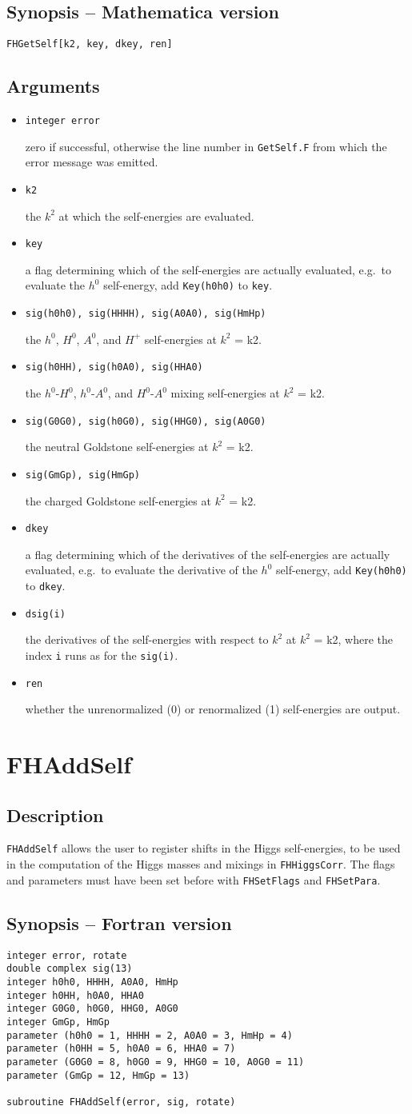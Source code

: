 \documentclass[12pt,a4paper]{report}
\newcommand{\CODE}[1]{\texttt{#1}}
\newcommand{\VARIN}[1]{%
  \item[\fbox{\scriptsize\textsc{in}}]
  \CODE{#1}\par}
\newcommand{\VAROUT}[1]{%
  \item[\fbox{\scriptsize\textsc{out}}]
  \CODE{#1}\par}
\newcommand{\ROUTINE}[1]{\pagebreak
  \section*{#1}%
  \addcontentsline{toc}{section}{#1}}
\newcommand{\DESCRIPTION}{\subsection*{Description}}
\newcommand{\FSYNOPSIS}{\subsection*{Synopsis -- Fortran version}}
\newcommand{\MSYNOPSIS}{\subsection*{Synopsis -- Mathematica version}}
\newcommand{\ARGUMENTS}{\subsection*{Arguments}\begin{itemize}}
\newcommand{\ENDARGUMENTS}{\end{itemize}}
\newcommand\eg{e.g.\ }
\begin{document}
\MSYNOPSIS

\begin{verbatim}
FHGetSelf[k2, key, dkey, ren]
\end{verbatim}

\ARGUMENTS

\VAROUT{integer error}
zero if successful, otherwise the line number in \CODE{GetSelf.F}
from which the error message was emitted.

\VARIN{k2}
the $k^2$ at which the self-energies are evaluated.

\VARIN{key}
a flag determining which of the self-energies are actually evaluated,
\eg to evaluate the $h^0$ self-energy, add \CODE{Key(h0h0)} to
\CODE{key}.

\VAROUT{sig(h0h0), sig(HHHH), sig(A0A0), sig(HmHp)}
the $h^0$, $H^0$, $A^0$, and $H^+$ self-energies at $k^2$ = k2.

\VAROUT{sig(h0HH), sig(h0A0), sig(HHA0)}
the $h^0$-$H^0$, $h^0$-$A^0$, and $H^0$-$A^0$ mixing self-energies at 
$k^2$ = k2.

\VAROUT{sig(G0G0), sig(h0G0), sig(HHG0), sig(A0G0)}
the neutral Goldstone self-energies at $k^2$ = k2.

\VAROUT{sig(GmGp), sig(HmGp)}
the charged Goldstone self-energies at $k^2$ = k2.

\VARIN{dkey}
a flag determining which of the derivatives of the self-energies
are actually evaluated, \eg to evaluate the derivative of the 
$h^0$ self-energy, add \CODE{Key(h0h0)} to \CODE{dkey}.

\VAROUT{dsig(i)}
the derivatives of the self-energies with respect to $k^2$ at
$k^2$ = k2, where the index \CODE{i} runs as for the \CODE{sig(i)}.

\VARIN{ren}
whether the unrenormalized (0) or renormalized (1) self-energies
are output.

\ENDARGUMENTS


\ROUTINE{FHAddSelf}

\DESCRIPTION

\CODE{FHAddSelf} allows the user to register shifts in the Higgs
self-energies, to be used in the computation of the Higgs masses and
mixings in \CODE{FHHiggsCorr}.  The flags and parameters must have been
set before with \CODE{FHSetFlags} and \CODE{FHSetPara}.

\FSYNOPSIS

\begin{verbatim}
integer error, rotate
double complex sig(13)
integer h0h0, HHHH, A0A0, HmHp
integer h0HH, h0A0, HHA0
integer G0G0, h0G0, HHG0, A0G0
integer GmGp, HmGp
parameter (h0h0 = 1, HHHH = 2, A0A0 = 3, HmHp = 4)
parameter (h0HH = 5, h0A0 = 6, HHA0 = 7)
parameter (G0G0 = 8, h0G0 = 9, HHG0 = 10, A0G0 = 11)
parameter (GmGp = 12, HmGp = 13)

subroutine FHAddSelf(error, sig, rotate)
\end{verbatim}
\end{document}
